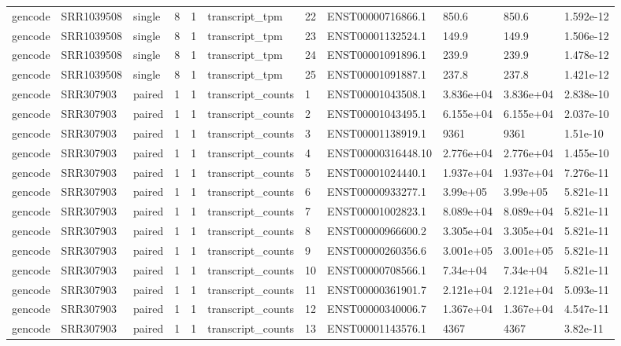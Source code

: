 \begin{tabular}{lllllllllll}
gencode & SRR1039508 & single & 8 & 1 & transcript\_tpm & 22 & ENST00000716866.1 & 850.6 & 850.6 & 1.592e-12 \\
gencode & SRR1039508 & single & 8 & 1 & transcript\_tpm & 23 & ENST00001132524.1 & 149.9 & 149.9 & 1.506e-12 \\
gencode & SRR1039508 & single & 8 & 1 & transcript\_tpm & 24 & ENST00001091896.1 & 239.9 & 239.9 & 1.478e-12 \\
gencode & SRR1039508 & single & 8 & 1 & transcript\_tpm & 25 & ENST00001091887.1 & 237.8 & 237.8 & 1.421e-12 \\
gencode & SRR307903 & paired & 1 & 1 & transcript\_counts & 1 & ENST00001043508.1 & 3.836e+04 & 3.836e+04 & 2.838e-10 \\
gencode & SRR307903 & paired & 1 & 1 & transcript\_counts & 2 & ENST00001043495.1 & 6.155e+04 & 6.155e+04 & 2.037e-10 \\
gencode & SRR307903 & paired & 1 & 1 & transcript\_counts & 3 & ENST00001138919.1 & 9361 & 9361 & 1.51e-10 \\
gencode & SRR307903 & paired & 1 & 1 & transcript\_counts & 4 & ENST00000316448.10 & 2.776e+04 & 2.776e+04 & 1.455e-10 \\
gencode & SRR307903 & paired & 1 & 1 & transcript\_counts & 5 & ENST00001024440.1 & 1.937e+04 & 1.937e+04 & 7.276e-11 \\
gencode & SRR307903 & paired & 1 & 1 & transcript\_counts & 6 & ENST00000933277.1 & 3.99e+05 & 3.99e+05 & 5.821e-11 \\
gencode & SRR307903 & paired & 1 & 1 & transcript\_counts & 7 & ENST00001002823.1 & 8.089e+04 & 8.089e+04 & 5.821e-11 \\
gencode & SRR307903 & paired & 1 & 1 & transcript\_counts & 8 & ENST00000966600.2 & 3.305e+04 & 3.305e+04 & 5.821e-11 \\
gencode & SRR307903 & paired & 1 & 1 & transcript\_counts & 9 & ENST00000260356.6 & 3.001e+05 & 3.001e+05 & 5.821e-11 \\
gencode & SRR307903 & paired & 1 & 1 & transcript\_counts & 10 & ENST00000708566.1 & 7.34e+04 & 7.34e+04 & 5.821e-11 \\
gencode & SRR307903 & paired & 1 & 1 & transcript\_counts & 11 & ENST00000361901.7 & 2.121e+04 & 2.121e+04 & 5.093e-11 \\
gencode & SRR307903 & paired & 1 & 1 & transcript\_counts & 12 & ENST00000340006.7 & 1.367e+04 & 1.367e+04 & 4.547e-11 \\
gencode & SRR307903 & paired & 1 & 1 & transcript\_counts & 13 & ENST00001143576.1 & 4367 & 4367 & 3.82e-11 \\

\end{tabular}
